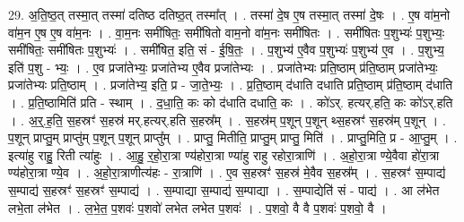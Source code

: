 \documentclass[17pt]{extarticle}
\begin{document}
29. अ॒ति॒ष्ठ॒त् तस्मा॒त् तस्मा॑ दतिष्ठ दतिष्ठ॒त् तस्मा᳚त् । . तस्मा॑ दे॒ष ए॒ष तस्मा॒त् तस्मा॑ दे॒षः । . ए॒ष वा॑म॒नो वा॑म॒न ए॒ष ए॒ष वा॑म॒नः । . वा॒म॒नः समी॑षितः॒ समी॑षितो वाम॒नो वा॑म॒नः समी॑षितः । . समी॑षितः प॒शुभ्यः॑ प॒शुभ्यः॒ समी॑षितः॒ समी॑षितः प॒शुभ्यः॑ । . समी॑षित॒ इति॒ सं - ई॒षि॒तः॒ । . प॒शुभ्य॑ ए॒वैव प॒शुभ्यः॑ प॒शुभ्य॑ ए॒व । . प॒शुभ्य॒ इति॑ प॒शु - भ्यः॒ । . ए॒व प्रजा॑तेभ्यः॒ प्रजा॑तेभ्य ए॒वैव प्रजा॑तेभ्यः । . प्रजा॑तेभ्यः प्रति॒ष्ठाम् प्र॑ति॒ष्ठाम् प्रजा॑तेभ्यः॒ प्रजा॑तेभ्यः प्रति॒ष्ठाम् । . प्रजा॑तेभ्य॒ इति॒ प्र - जा॒ते॒भ्यः॒ । . प्र॒ति॒ष्ठाम् द॑धाति दधाति प्रति॒ष्ठाम् प्र॑ति॒ष्ठाम् द॑धाति । . प्र॒ति॒ष्ठामिति॑ प्रति - स्थाम् । . द॒धा॒ति॒ कः को द॑धाति दधाति॒ कः । . को॑ऽर्. हत्यर्.हति॒ कः को॑ऽर्.हति । . अ॒र्॒.ह॒ति॒ स॒हस्रꣳ॑ स॒हस्र॑ मर्.हत्यर्.हति स॒हस्र᳚म् । . स॒हस्र॑म् प॒शून् प॒शून् थ्स॒हस्रꣳ॑ स॒हस्र॑म् प॒शून् । . प॒शून् प्राप्तु॒म् प्राप्तु॑म् प॒शून् प॒शून् प्राप्तु᳚म् । . प्राप्तु॒ मितीति॒ प्राप्तु॒म् प्राप्तु॒ मिति॑ । . प्राप्तु॒मिति॒ प्र - आ॒प्तु॒म् । . इत्या॑हु राहु॒ रिती त्या॑हुः । . आ॒हु॒ र॒हो॒रा॒त्रा ण्य॑होरा॒त्रा ण्या॑हु राहु रहोरा॒त्राणि॑ । . अ॒हो॒रा॒त्रा ण्ये॒वैवा हो॑रा॒त्रा ण्य॑होरा॒त्रा ण्ये॒व । . अ॒हो॒रा॒त्राणीत्य॑हः - रा॒त्राणि॑ । . ए॒व स॒हस्रꣳ॑ स॒हस्र॑ मे॒वैव स॒हस्र᳚म् । . स॒हस्रꣳ॑ स॒म्पाद्य॑ स॒म्पाद्य॑ स॒हस्रꣳ॑ स॒हस्रꣳ॑ स॒म्पाद्य॑ । . स॒म्पाद्या स॒म्पाद्य॑ स॒म्पाद्या । . स॒म्पाद्येति॑ सं - पाद्य॑ । . आ ल॑भेत लभे॒ता ल॑भेत । . ल॒भे॒त॒ प॒शवः॑ प॒शवो॑ लभेत लभेत प॒शवः॑ । . प॒शवो॒ वै वै प॒शवः॑ प॒शवो॒ वै । \newline
\end{document}
